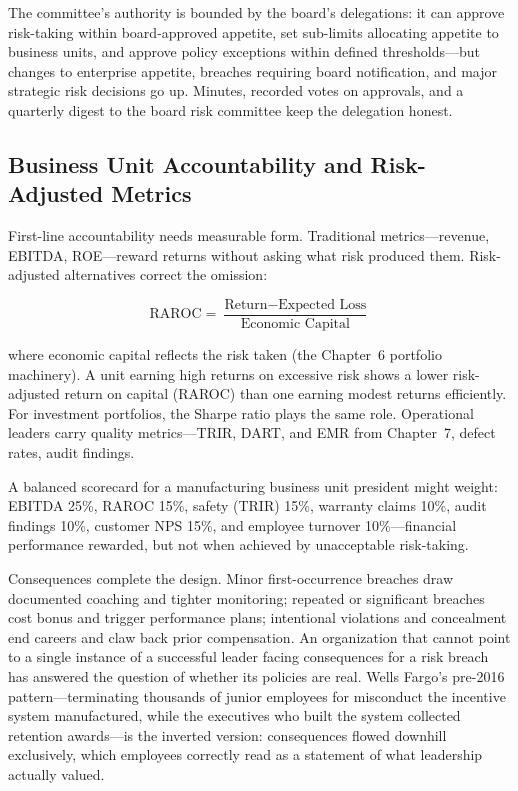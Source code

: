 \documentclass[11pt,openany]{book}
\begin{document}
The committee's authority is bounded by the board's delegations: it can
approve risk-taking within board-approved appetite, set sub-limits allocating
appetite to business units, and approve policy exceptions within defined
thresholds---but changes to enterprise appetite, breaches requiring board
notification, and major strategic risk decisions go up. Minutes, recorded
votes on approvals, and a quarterly digest to the board risk committee keep
the delegation honest.

\subsection{Business Unit Accountability and Risk-Adjusted Metrics}
\label{subsec:bu-accountability}

First-line accountability needs measurable form. Traditional
metrics---revenue, EBITDA, ROE---reward returns without asking what risk
produced them. Risk-adjusted alternatives correct the omission:

\[
\text{RAROC} = \frac{\text{Return} - \text{Expected Loss}}
{\text{Economic Capital}}
\]

where economic capital reflects the risk taken (the Chapter~6 portfolio
machinery). A unit earning high returns on excessive risk shows a lower
risk-adjusted return on capital (RAROC) than one earning modest returns
efficiently. For investment portfolios, the Sharpe ratio plays the same role.
Operational leaders carry quality metrics---TRIR, DART, and EMR from
Chapter~7, defect rates, audit findings.

A balanced scorecard for a manufacturing business unit president might
weight: EBITDA 25\%, RAROC 15\%, safety (TRIR) 15\%, warranty claims 10\%,
audit findings 10\%, customer NPS 15\%, and employee turnover
10\%---financial performance rewarded, but not when achieved by unacceptable
risk-taking.

Consequences complete the design. Minor first-occurrence breaches draw
documented coaching and tighter monitoring; repeated or significant breaches
cost bonus and trigger performance plans; intentional violations and
concealment end careers and claw back prior compensation. An organization
that cannot point to a single instance of a successful leader facing
consequences for a risk breach has answered the question of whether its
policies are real. Wells Fargo's pre-2016 pattern---terminating thousands of
junior employees for misconduct the incentive system manufactured, while the
executives who built the system collected retention awards---is the inverted
version: consequences flowed downhill exclusively, which employees correctly
read as a statement of what leadership actually valued.
\end{document}
